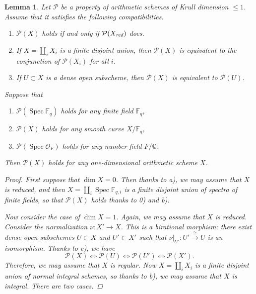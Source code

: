 \documentclass[draft]{article}
\DeclareMathOperator{\Spec}{Spec}
\newcommand{\FF}{\mathbb{F}}
\newcommand{\QQ}{\mathbb{Q}}
\newcommand{\red}{\text{\it red}}
\theoremstyle{myplain}
\newtheorem{lemma}[theorem]{Lemma}
\theoremstyle{mydefinition}
\numberwithin{equation}{section}
\begin{document}
\begin{lemma}
  \label{lemma:devissage}
  Let $\mathcal{P}$ be a property of arithmetic schemes of Krull dimension
  $\le 1$. Assume that it satisfies the following compatibilities.
  \begin{enumerate}
  \item[a)] $\mathcal{P} (X)$ holds if and only if $\mathcal{P} (X_\red)$ does.

  \item[b)] If $X = \coprod_i X_i$ is a finite disjoint union, then
    $\mathcal{P} (X)$ is equivalent to the conjunction of $\mathcal{P} (X_i)$ for
    all $i$.

  \item[c)] If $U \subset X$ is a dense open subscheme, then $\mathcal{P} (X)$
    is equivalent to $\mathcal{P} (U)$.
  \end{enumerate}
  Suppose that
  \begin{enumerate}
  \item[0)] $\mathcal{P} (\Spec \FF_q)$ holds for any finite field $\FF_q$,

  \item[1)] $\mathcal{P} (X)$ holds for any smooth curve $X/\FF_q$,

  \item[2)] $\mathcal{P} (\Spec \mathcal{O}_F)$ holds for any number field
    $F/\QQ$.
  \end{enumerate}
  Then $\mathcal{P} (X)$ holds for any one-dimensional arithmetic scheme $X$.

  \begin{proof}
    First suppose that $\dim X = 0$. Then thanks to a), we may assume that $X$
    is reduced, and then $X = \coprod_i \Spec \FF_{q,i}$ is a finite disjoint
    union of spectra of finite fields, so that $\mathcal{P} (X)$ holds thanks to
    0) and b).

    Now consider the case of $\dim X = 1$. Again, we may assume that $X$ is
    reduced. Consider the normalization $\nu\colon X' \to X$. This is a
    birational morphism: there exist dense open subschemes $U \subset X$ and
    $U' \subset X'$ such that
    $\left.\nu\right|_{U'}\colon U' \xrightarrow{\cong} U$ is an
    isomorphism. Thanks to c), we have
    \[ \mathcal{P} (X) \iff
      \mathcal{P} (U) \iff
      \mathcal{P} (U') \iff
      \mathcal{P} (X'). \]
    Therefore, we may assume that $X$ is regular. Now $X = \coprod_i X_i$ is a
    finite disjoint union of normal integral schemes, so thanks to b), we may
    assume that $X$ is integral. There are two cases.


\end{proof}
\end{lemma}
\end{document}
